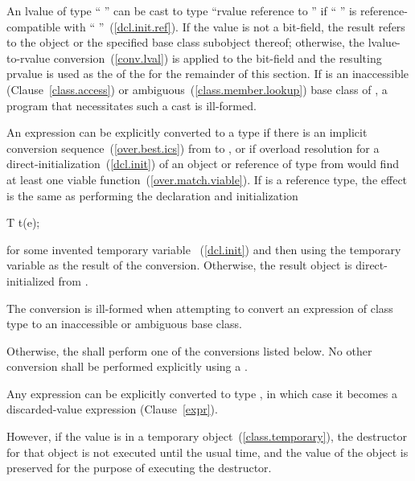 \pnum
An lvalue
of type `` '' can be cast to type ``rvalue
reference to  '' if `` '' is
reference-compatible with ``
''~(\ref{dcl.init.ref}). If the value is not a bit-field,
the result refers to the object or the specified base class subobject
thereof; otherwise, the lvalue-to-rvalue conversion~(\ref{conv.lval})
is applied to the bit-field and the resulting prvalue is used as the
 of the  for the remainder of this section.
If  is an inaccessible (Clause~\ref{class.access}) or
ambiguous~(\ref{class.member.lookup}) base class of ,
a program that necessitates such a cast is ill-formed.

\pnum
An expression  can be explicitly converted to a type 
if there is an implicit conversion sequence~(\ref{over.best.ics})
from  to , or
if overload resolution for a direct-initialization~(\ref{dcl.init})
of an object or reference of type  from 
would find at least one viable function~(\ref{over.match.viable}). 
If  is a reference type, the effect is
the same as performing the declaration and initialization
\begin{codeblock}
 T t(e);
\end{codeblock}
for some invented temporary variable ~(\ref{dcl.init})
and then using the temporary variable as the result of the conversion.
Otherwise, the result object is direct-initialized from .
\begin{note}
The conversion is ill-formed when attempting to convert an
expression of class type to an inaccessible or ambiguous base class.
\end{note}

\pnum
Otherwise, the  shall perform one of the conversions
listed below. No other conversion shall be performed explicitly using a
.

\pnum
Any expression can be explicitly converted to type \cv{}
, in which case it becomes a discarded-value
expression (Clause~\ref{expr}).
\begin{note}
However, if the value is in a temporary
object~(\ref{class.temporary}), the destructor for that
object is
not executed until the usual time, and the value of the object is
preserved for the purpose of executing the destructor.
\end{note}


